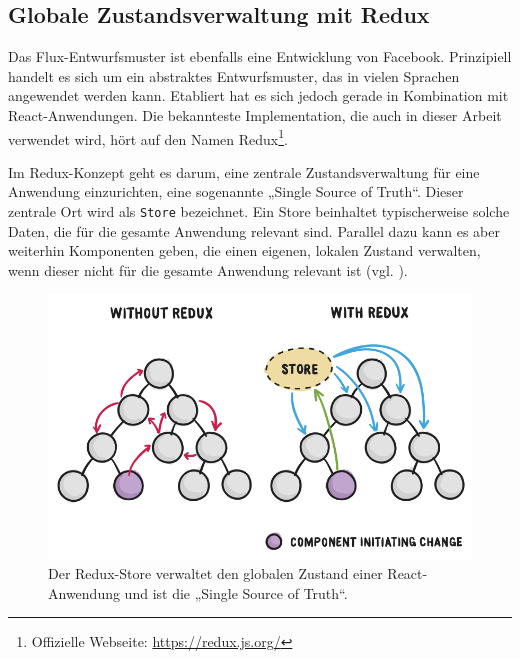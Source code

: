 \subsection{Globale Zustandsverwaltung mit Redux}
\label{chap:redux_state_management}
Das Flux-Entwurfsmuster ist ebenfalls eine Entwicklung von Facebook. Prinzipiell handelt es sich um ein abstraktes Entwurfsmuster, das in vielen Sprachen angewendet werden kann. Etabliert hat es sich jedoch gerade in Kombination mit React-Anwendungen. Die bekannteste Implementation, die auch in dieser Arbeit verwendet wird, hört auf den Namen Redux\footnote{Offizielle Webseite: \url{https://redux.js.org/}}.

Im Redux-Konzept geht es darum, eine zentrale Zustandsverwaltung für eine Anwendung einzurichten, eine sogenannte „Single Source of Truth“. Dieser zentrale Ort wird als \texttt{Store} bezeichnet. Ein Store beinhaltet typischerweise solche Daten, die für die gesamte Anwendung relevant sind. Parallel dazu kann es aber weiterhin Komponenten geben, die einen eigenen, lokalen Zustand verwalten, wenn dieser nicht für die gesamte Anwendung relevant ist (vgl. \cite{web:redux_motivation}).

\begin{figure}[H]
    \includegraphics[width=12cm]{chapter/entwurf/bilder/BA_redux.png}
    \centering
    \caption[Redux Dataflow]{Der Redux-Store verwaltet den globalen Zustand einer React-Anwendung und ist die „Single Source of Truth“.\protect\footnotemark}

    \label{abb:redux_store}
\end{figure}



